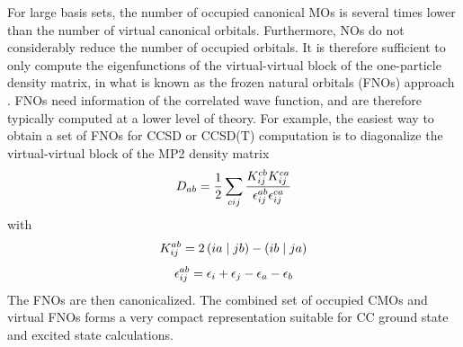 For large basis sets, the number of occupied canonical MOs is several times lower than the number of virtual canonical orbitals. Furthermore, NOs do not considerably reduce the number of occupied orbitals. It is therefore sufficient to only compute the eigenfunctions of the virtual-virtual block of the one-particle density matrix, in what is known as the frozen natural orbitals (FNOs) approach \cite{Bar1970}. FNOs need information of the correlated wave function, and are therefore typically computed at a lower level of theory. For example, the easiest way to obtain a set of FNOs for CCSD or CCSD(T) computation is to diagonalize the virtual-virtual block  of the MP2 density matrix \cite{Sos1989, Tau2005, Tau2008}
\begin{equation}
D_{ab} = \frac{1}{2} \sum_{cij} \frac{K_{ij}^{cb} K_{ij}^{ca}}{\epsilon_{ij}^{ab} \epsilon_{ij}^{ca}}
\end{equation}
\noindent with
\begin{equation}
K_{ij}^{ab} = 2 \left( ia \mid jb \right) - \left( ib \mid ja \right)
\end{equation}
\begin{equation}
\epsilon_{ij}^{ab} = \epsilon_i + \epsilon_j - \epsilon_a - \epsilon_b 
\end{equation}
The FNOs are then canonicalized. The combined set of occupied CMOs and virtual FNOs forms a very compact representation suitable for CC ground state and excited state calculations.





